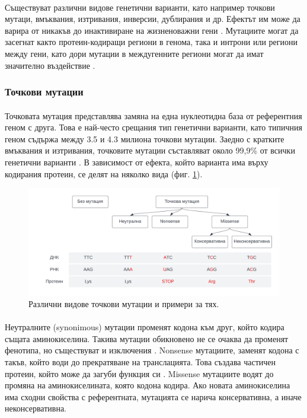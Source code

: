 \documentclass[pdftex,cyrillic,14pt,a4page,twoside,openright]{extreport}
\begin{document}
\paragraph{}
Съществуват различни видове генетични варианти, като например точкови мутаци, вмъквания, изтривания, инверсии, дублирания и др. Ефектът им може да варира от никакъв до инактивиране на жизненоважни гени \cite{taiping1998}. Мутациите могат да засегнат както протеин-кодиращи региони в генома, така и интрони или региони между гени, като дори мутации в междугенните региони могат да имат значително въздействие \cite{zou2020}.

\subsubsection{Точкови мутации}
\paragraph{}
Точковата мутация представлява замяна на една нуклеотидна база от референтния геном с друга. Това е най-често срещания тип генетични варианти, като типичния геном съдържа между 3.5 и 4.3 милиона точкови мутации. Заедно с кратките вмъквания и изтривания, точковите мутации съставляват около 99,9\% от всички генетични варианти \cite{auton2015}. В зависимост от ефекта, който варианта има върху кодирания протеин, се делят на няколко вида (фиг. \ref{fig:snp_types}).

\begin{figure}[h]
  \centering
  \includegraphics[width=17cm]{figures/snp_types}
  \caption {Различни видове точкови мутации и примери за тях.}
  \label{fig:snp_types}
\end{figure}

\paragraph{}
Неутралните (synonimous) мутации променят кодона към друг, който кодира същата аминокиселина. Такива мутации обикновено не се очаква да променят фенотипа, но съществуват и изключения \cite{kimchi2007}. Nonsense мутациите, заменят кодона с такъв, който води до прекратяване на транслацията. Това създава частичен протеин, който може да загуби функция си \cite{bidou2012}. Missense мутациите водят до промяна на аминокиселината, която кодона кодира. Ако новата аминокиселина има сходни свойства с референтната, мутацията се нарича консервативна, а иначе неконсервативна.
\end{document}
